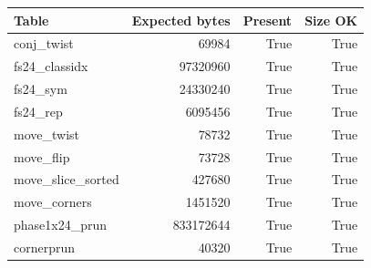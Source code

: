 {\small
\begin{tabular}{lrrr}
\hline
Table & Expected bytes & Present & Size OK \\
\hline
conj\_twist & 69984 & True & True \\
fs24\_classidx & 97320960 & True & True \\
fs24\_sym & 24330240 & True & True \\
fs24\_rep & 6095456 & True & True \\
move\_twist & 78732 & True & True \\
move\_flip & 73728 & True & True \\
move\_slice\_sorted & 427680 & True & True \\
move\_corners & 1451520 & True & True \\
phase1x24\_prun & 833172644 & True & True \\
cornerprun & 40320 & True & True \\
\hline
\end{tabular}
}
